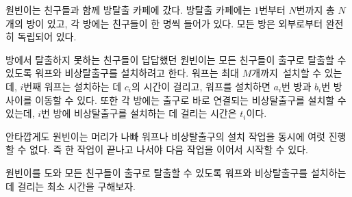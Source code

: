 원빈이는 친구들과 함께 방탈출 카페에 갔다. 방탈출 카페에는 $1$번부터 $N$번까지 총 $N$개의 방이 있고, 각 방에는 친구들이 한 명씩 들어가 있다. 모든 방은 외부로부터 완전히 독립되어 있다.

방에서 탈출하지 못하는 친구들이 답답했던 원빈이는 모든 친구들이 출구로 탈출할 수 있도록 워프와 비상탈출구를 설치하려고 한다. 워프는 최대 $M$개까지 설치할 수 있는데, $i$번째 워프는 설치하는 데 $c_i$의 시간이 걸리고, 워프를 설치하면 $a_i$번 방과 $b_i$번 방 사이를 이동할 수 있다. 또한 각 방에는 출구로 바로 연결되는 비상탈출구를 설치할 수 있는데, $i$번 방에 비상탈출구를 설치하는 데 걸리는 시간은 $t_i$이다.

안타깝게도 원빈이는 머리가 나빠 워프나 비상탈출구의 설치 작업을 동시에 여럿 진행할 수 없다. 즉 한 작업이 끝나고 나서야 다음 작업을 이어서 시작할 수 있다.

원빈이를 도와 모든 친구들이 출구로 탈출할 수 있도록 워프와 비상탈출구를 설치하는 데 걸리는 최소 시간을 구해보자.